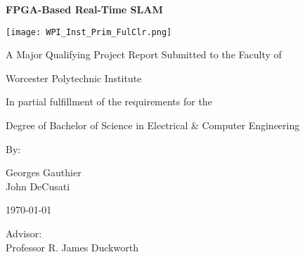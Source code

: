\begin{titlepage}
	\centering
	{\huge\bfseries FPGA-Based Real-Time SLAM\par}
	\vfill
	\texttt{[image: WPI\_Inst\_Prim\_FulClr.png]} %
	\vfill
	{\par\large A Major Qualifying Project Report Submitted to the Faculty of \par}
	\vspace{0.25cm}
	{\large Worcester Polytechnic Institute\par}
	\vfill
	{\large In partial fulfillment of the requirements for the \par}
	\vspace{0.25cm}
	{\large Degree of Bachelor of Science in Electrical \& Computer Engineering\par}
	\vfill
	{\large By: \par}
	\vspace{0.25cm}
	{\Large Georges Gauthier \\ John DeCusati \par} 
	\vfill
	{\large \today \par}
	\vfill
	{\begin{flushright} 
	\large Advisor: \\ \Large Professor R. James Duckworth
	\end{flushright}}
\end{titlepage}
